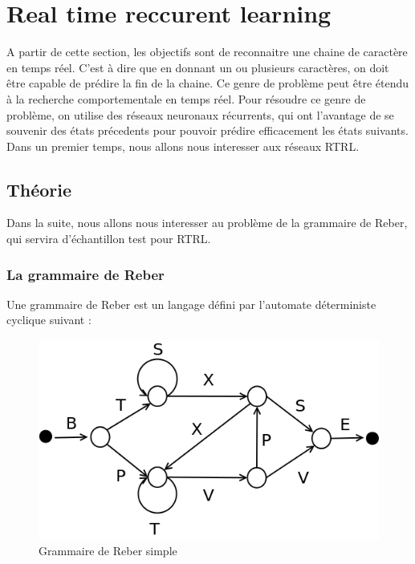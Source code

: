 
\chapter{Real time reccurent learning}

A partir de cette section, les objectifs sont de reconnaitre une chaine de caractère en temps réel. C'est à dire que en donnant un ou plusieurs caractères, on doit être capable de prédire la fin de la chaine. Ce genre de problème peut être étendu à la recherche comportementale en temps réel. Pour résoudre ce genre de problème, on utilise des réseaux neuronaux récurrents, qui ont l'avantage de se souvenir des états précedents pour pouvoir prédire efficacement les états suivants. Dans un premier temps, nous allons nous interesser aux réseaux RTRL.

\section{Théorie}

Dans la suite, nous allons nous interesser au problème de la grammaire de Reber, qui servira d'échantillon test pour RTRL.

\subsection{La grammaire de Reber}

 Une grammaire de Reber est un langage défini par l'automate déterministe cyclique suivant :
 
\begin{figure}[!ht]
\begin{center}
\includegraphics[scale=0.4]{rtrl/reberGrammar.png}
\end{center}
\caption{Grammaire de Reber simple}
\end{figure}

